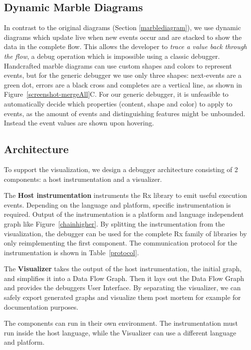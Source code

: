\subsection{Dynamic Marble Diagrams}
In contrast to the original diagrams (Section \ref{marblediagram}), we use dynamic diagrams which update live when new events occur and are stacked to show the data in the complete flow. This allows the developer to \emph{trace a value back through the flow}, a debug operation which is impossible using a classic debugger. Handcrafted marble diagrams can use custom shapes and colors to represent events, but for the generic debugger we use only three shapes: next-events are a green dot, errors are a black cross and completes are a vertical line, as shown in Figure~\ref{screenshot-mergeAll}C. For our generic debugger, it is unfeasible to automatically decide which properties (content, shape and color) to apply to events, as the amount of events and distinguishing features might be unbounded. Instead the event values are shown upon hovering.

\subsection{Architecture}
To support the visualization, we design a debugger architecture consisting of 2 components: a host instrumentation and a visualizer.

The \textbf{Host instrumentation} instruments the Rx library to emit useful execution events. Depending on the language and platform, specific instrumentation is required. Output of the instrumentation is a platform and language independent graph like Figure~\ref{chainhigher}. By splitting the instrumentation from the visualization, the debugger can be used for the complete Rx family of libraries by only reimplementing the first component. The communication protocol for the instrumentation is shown in Table~\ref{protocol}. 

The \textbf{Visualizer} takes the output of the host instrumentation, the initial graph, and simplifies it into a Data Flow Graph. Then it lays out the Data Flow Graph and provides the debuggers User Interface. By separating the visualizer, we can safely export generated graphs and visualize them post mortem for example for documentation purposes.

The components can run in their own environment. The instrumentation must run inside the host language, while the Visualizer can use a different language and platform.

